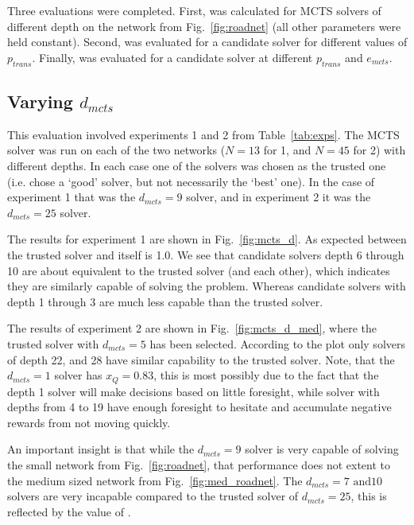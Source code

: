 Three evaluations were completed. First, \xQ{} was calculated for MCTS solvers of different depth on the network from Fig.~\ref{fig:roadnet} (all other parameters were held constant). Second, \xQ{} was evaluated for a candidate solver for different values of $p_{trans}$. Finally, \xQ{} was evaluated for a candidate solver at different $p_{trans}$ and $e_{mcts}$.

\subsection{Varying $d_{mcts}$}
This evaluation involved experiments 1 and 2 from Table~\ref{tab:exps}. The MCTS solver was run on each of the two networks ($N=13$ for 1, and $N=45$ for 2) with different depths. In each case one of the solvers was chosen as the trusted one (i.e. chose a `good' solver, but not necessarily the `best' one). In the case of experiment 1 that was the $d_{mcts}=9$ solver, and in experiment 2 it was the $d_{mcts}=25$ solver.

The results for experiment 1 are shown in Fig.~\ref{fig:mcts_d}. As expected \xQ{} between the trusted solver and itself is 1.0. We see that candidate solvers depth 6 through 10 are about equivalent to the trusted solver (and each other), which indicates they are similarly capable of solving the problem. Whereas candidate solvers with depth 1 through 3 are much less capable than the trusted solver.

The results of experiment 2 are shown in Fig.~\ref{fig:mcts_d_med}, where the trusted solver with $d_{mcts}=5$ has been selected. According to the plot only solvers of depth 22, and 28 have similar capability to the trusted solver. Note, that the $d_{mcts}=1$ solver has $x_Q=0.83$, this is most possibly due to the fact that the depth 1 solver will make decisions based on little foresight, while solver with depths from 4 to 19 have enough foresight to hesitate and accumulate negative rewards from not moving quickly.

An important insight is that while the $d_{mcts}=9$ solver is very capable of solving the small network from Fig.~\ref{fig:roadnet}, that performance does not extent to the medium sized network from Fig.~\ref{fig:med_roadnet}. The $d_{mcts}=7 \text{ and} 10$ solvers are very incapable compared to the trusted solver of $d_{mcts}=25$, this is reflected by the value of \xQ.

